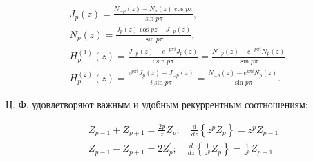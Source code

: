 \documentclass[10pt]{article}
\begin{document}
\[

\begin{gathered}

J_{p}(z)=\frac{N_{-p}(z)-N_{p}(z) \cos p \pi}{\sin p \pi}, \\

N_{p}(z)=\frac{J_{p}(z) \cos p z-J_{-p}(z)}{\sin p \pi}, \\

H_{p}^{(1)}(z)=\frac{J_{-p}(z)-e^{-p \pi i} J_{p}(z)}{i \sin p \pi}=\frac{N_{-p}(z)-e^{-p \pi i} N_{p}(z)}{\sin p \pi}, \\

H_{p}^{(2)}(z)=\frac{e^{p \pi i} J_{p}(z)-J_{-p}(z)}{i \sin p \pi}=\frac{N_{-p}(z)-e^{p \pi i} N_{p}(z)}{\sin p \pi} .

\end{gathered}

\]



Ц. Ф. удовлетворяют важным и удобным рекуррентным соотношениям:



\[

\begin{aligned}

& Z_{p-1}+Z_{p+1}=\frac{2 p}{z} Z_{p} ; \quad \frac{d}{d z}\left\{z^{p} Z_{p}\right\}=z^{p} Z_{p-1} \\

& Z_{p-1}-Z_{p+1}=2 Z_{p}^{\prime} ; \quad \frac{d}{d z}\left\{\frac{1}{z^{p}} Z_{p}\right\}=\frac{1}{z^{p}} Z_{p+1}

\end{aligned}

\]
\end{document}
